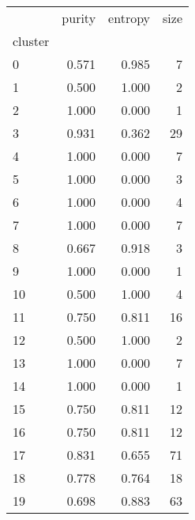 \begin{tabular}{lrrr}
\toprule
{} &  purity &  entropy &  size \\
cluster &         &          &       \\
\midrule
0       &   0.571 &    0.985 &     7 \\
1       &   0.500 &    1.000 &     2 \\
2       &   1.000 &   0.000 &     1 \\
3       &   0.931 &    0.362 &    29 \\
4       &   1.000 &   0.000 &     7 \\
5       &   1.000 &   0.000 &     3 \\
6       &   1.000 &   0.000 &     4 \\
7       &   1.000 &   0.000 &     7 \\
8       &   0.667 &    0.918 &     3 \\
9       &   1.000 &   0.000 &     1 \\
10      &   0.500 &    1.000 &     4 \\
11      &   0.750 &    0.811 &    16 \\
12      &   0.500 &    1.000 &     2 \\
13      &   1.000 &   0.000 &     7 \\
14      &   1.000 &   0.000 &     1 \\
15      &   0.750 &    0.811 &    12 \\
16      &   0.750 &    0.811 &    12 \\
17      &   0.831 &    0.655 &    71 \\
18      &   0.778 &    0.764 &    18 \\
19      &   0.698 &    0.883 &    63 \\
\bottomrule
\end{tabular}
